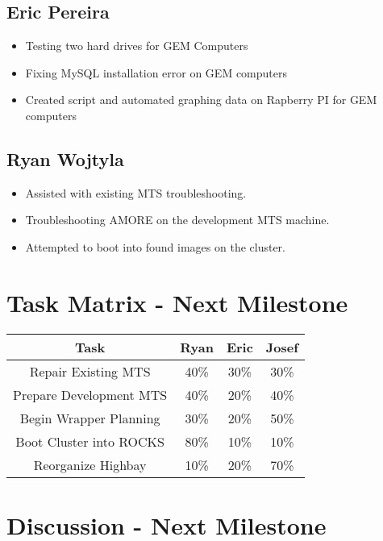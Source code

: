 \documentclass[12pt]{article}
\begin{document}
\subsection{Eric Pereira}

\begin{itemize}
\item Testing two hard drives for GEM Computers
\item Fixing MySQL installation error on GEM computers
\item Created script and automated graphing data on Rapberry PI for GEM computers
\end{itemize}

\subsection{Ryan Wojtyla}

\begin{itemize}
\item Assisted with existing MTS troubleshooting.
\item Troubleshooting AMORE on the development MTS machine.
\item Attempted to boot into found images on the cluster.
\end{itemize}

\section{Task Matrix - Next Milestone}

\begin{center}
  \begin{tabular}{|c|c|c|c|}
    \hline
    Task & Ryan & Eric & Josef \\
    \hline
    Repair Existing MTS & 40\% & 30\% & 30\% \\
    Prepare Development MTS & 40\% & 20\% & 40\% \\
    Begin Wrapper Planning & 30\% & 20\% & 50\% \\
    Boot Cluster into ROCKS & 80\% & 10\% & 10\% \\
    Reorganize Highbay & 10\% & 20\% & 70\% \\
    \hline
  \end{tabular}
\end{center}

\section{Discussion - Next Milestone}
\end{document}
